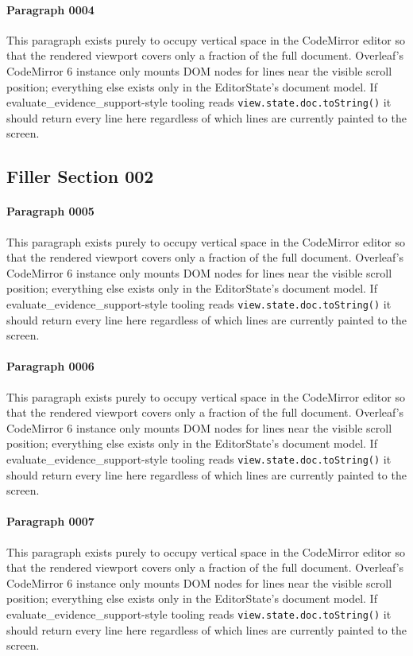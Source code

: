 \documentclass{article}
\begin{document}
\paragraph{Paragraph 0004}
This paragraph exists purely to occupy vertical space in the CodeMirror editor so that the rendered viewport covers only a fraction of the full document. Overleaf's CodeMirror 6 instance only mounts DOM nodes for lines near the visible scroll position; everything else exists only in the EditorState's document model. If evaluate\_evidence\_support-style tooling reads \texttt{view.state.doc.toString()} it should return every line here regardless of which lines are currently painted to the screen.

\subsection{Filler Section 002}
\paragraph{Paragraph 0005}
This paragraph exists purely to occupy vertical space in the CodeMirror editor so that the rendered viewport covers only a fraction of the full document. Overleaf's CodeMirror 6 instance only mounts DOM nodes for lines near the visible scroll position; everything else exists only in the EditorState's document model. If evaluate\_evidence\_support-style tooling reads \texttt{view.state.doc.toString()} it should return every line here regardless of which lines are currently painted to the screen.

\paragraph{Paragraph 0006}
This paragraph exists purely to occupy vertical space in the CodeMirror editor so that the rendered viewport covers only a fraction of the full document. Overleaf's CodeMirror 6 instance only mounts DOM nodes for lines near the visible scroll position; everything else exists only in the EditorState's document model. If evaluate\_evidence\_support-style tooling reads \texttt{view.state.doc.toString()} it should return every line here regardless of which lines are currently painted to the screen.

\paragraph{Paragraph 0007}
This paragraph exists purely to occupy vertical space in the CodeMirror editor so that the rendered viewport covers only a fraction of the full document. Overleaf's CodeMirror 6 instance only mounts DOM nodes for lines near the visible scroll position; everything else exists only in the EditorState's document model. If evaluate\_evidence\_support-style tooling reads \texttt{view.state.doc.toString()} it should return every line here regardless of which lines are currently painted to the screen.
\end{document}

